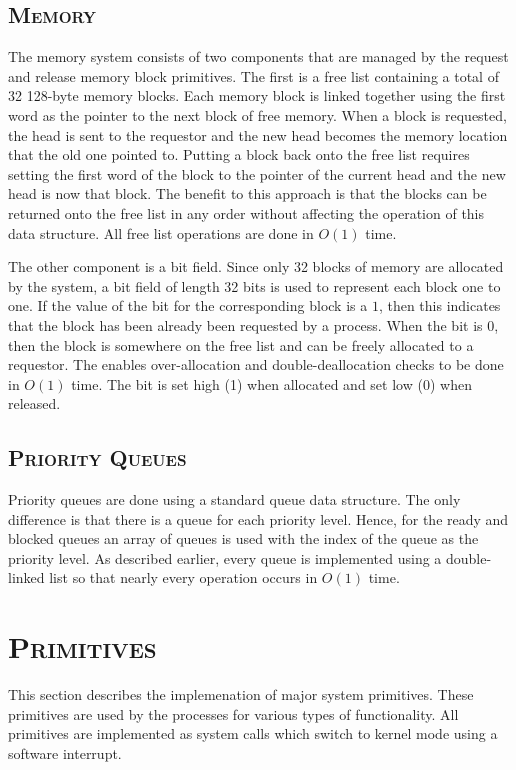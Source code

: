 \documentclass[oneside]{report}
\begin{document}
\subsection{\textsc{Memory}}
\label{sec:mem_management}
The memory system consists of two components that are managed by the request
and release memory block primitives. The first is a free list containing a
total of 32 128-byte memory blocks. Each memory block is linked together using
the first word as the pointer to the next block of free memory. When a block is
requested, the head is sent to the requestor and the new head becomes the
memory location that the old one pointed to. Putting a block back onto the free
list requires setting the first word of the block to the pointer of the current
head and the new head is now that block. The benefit to this approach is that
the blocks can be returned onto the free list in any order without affecting
the operation of this data structure. All free list operations are done in
$O(1)$ time.

The other component is a bit field. Since only 32 blocks of memory are
allocated by the system, a bit field of length 32 bits is used to represent
each block one to one. If the value of the bit for the corresponding block is a
$1$, then this indicates that the block has been already been requested by a 
process. When the bit is $0$, then the block is somewhere on the free list and 
can be freely allocated to a requestor. The enables over-allocation and 
double-deallocation checks to be done in $O(1)$ time. The bit is set high (1) 
when allocated and set low (0) when released.

\subsection{\textsc{Priority Queues}}
Priority queues are done using a standard queue data structure. The only
difference is that there is a queue for each priority level. Hence, for the
ready and blocked queues an array of queues is used with the index of the queue
as the priority level. As described earlier, every queue is implemented using a
double-linked list so that nearly every operation occurs in $O(1)$ time.


\section{\textsc{Primitives}}
This section describes the implemenation of major system primitives. These 
primitives are used by the processes for various types of functionality. All 
primitives are implemented as system calls which switch to kernel mode using a 
software interrupt.
\end{document}

